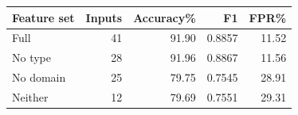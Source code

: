 \centering\footnotesize
\begin{tabular}{@{}lrrrr@{}}
\toprule
Feature set & Inputs & Accuracy\% & F1 & FPR\%\\\midrule
Full & 41 & 91.90 & 0.8857 & 11.52\\
No type & 28 & 91.96 & 0.8867 & 11.56\\
No domain & 25 & 79.75 & 0.7545 & 28.91\\
Neither & 12 & 79.69 & 0.7551 & 29.31\\
\bottomrule
\end{tabular}
